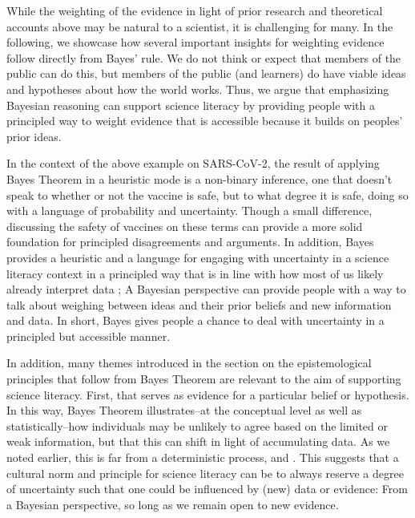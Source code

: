 \documentclass[man]{apa7}
\begin{document}
While the weighting of the evidence in light of prior research and theoretical accounts above may be natural to a scientist, it is challenging for many. In the following, we showcase how several important insights for weighting evidence follow directly from Bayes' rule. We do not think or expect that members of the public can do this, but members of the public (and learners) do have viable ideas and hypotheses about how the world works. Thus, we argue that emphasizing Bayesian reasoning can support science literacy by providing people with a principled way to weight evidence that is accessible because it builds on peoples' prior ideas.

In the context of the above example on SARS-CoV-2, the result of applying Bayes Theorem in a heuristic mode is a non-binary inference, one that doesn't speak to whether or not the vaccine is safe, but to what degree it is safe, doing so with a language of probability and uncertainty. Though a small difference, discussing the safety of vaccines on these terms can provide a more solid foundation for principled disagreements and arguments. In addition, Bayes provides a heuristic and a language for engaging with uncertainty in a science literacy context in a principled way that is in line with how most of us likely already interpret data \parencite{tgk06, gw12, gh95}; A Bayesian perspective can provide people with a way to talk about weighing between ideas and their prior beliefs and new information and data. In short, Bayes gives people a chance to deal with uncertainty in a principled but accessible manner.

In addition, many themes introduced in the section on the epistemological principles that follow from Bayes Theorem are relevant to the aim of supporting science literacy. First,  that serves as evidence for a particular belief or hypothesis. In this way, Bayes Theorem illustrates--at the conceptual level as well as statistically--how individuals may be unlikely to agree based on the limited or weak information, but that this can shift in light of accumulating data. As we noted earlier, this is far from a deterministic process, and . This suggests that a cultural norm and principle for science literacy can be to always reserve a degree of uncertainty such that one could be influenced by (new) data or evidence: From a Bayesian perspective,  so long as we remain open to new evidence.
\end{document}
